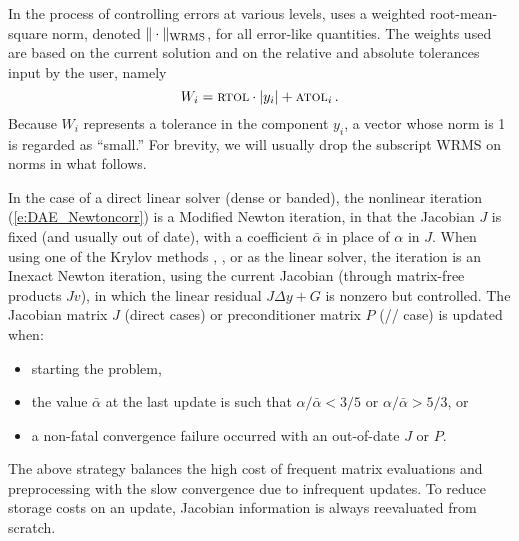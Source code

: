 In the process of controlling errors at various levels, {\ida} uses a
weighted root-mean-square norm, denoted 
$\|\cdot\|_{\mbox{\scriptsize WRMS}}$, for all 
error-like quantities.  The weights used are based on the current
solution and on the relative and absolute tolerances input by the
user, namely
\begin{equation}\label{e:errwt}
 W_i = \mbox{\sc rtol} \cdot |y_i| + \mbox{\sc atol}_i \, .
\end{equation}
Because $W_i$ represents a tolerance in the component $y_i$, a vector
whose norm is 1 is regarded as ``small.''  For brevity, we will
usually drop the subscript WRMS on norms in what follows.

In the case of a direct linear solver (dense or banded), the nonlinear 
iteration (\ref{e:DAE_Newtoncorr}) is a Modified Newton iteration, in
that the Jacobian $J$ is fixed (and usually out of date), with a coefficient 
$\bar\alpha$ in place of $\alpha$ in $J$. When using one of the Krylov methods
{\spgmr}, {\spbcg}, or {\sptfqmr} as the linear solver, the iteration is an
Inexact Newton iteration, using the current Jacobian (through matrix-free products
$Jv$), in which the linear residual $J\Delta y + G$ is nonzero but controlled.
The Jacobian matrix $J$ (direct cases) or preconditioner matrix $P$ 
({\spgmr}/{\spbcg}/{\sptfqmr} case) is updated when:
\begin{itemize}
\item starting the problem,
\item the value $\bar\alpha$ at the last update is such that
  $\alpha / {\bar\alpha} < 3/5$ or $\alpha / {\bar\alpha} > 5/3$, or
\item a non-fatal convergence failure occurred with an out-of-date $J$ or $P$.
\end{itemize}
The above strategy balances the high cost of frequent matrix evaluations
and preprocessing with the slow convergence due to infrequent updates.
To reduce storage costs on an update, Jacobian information is always
reevaluated from scratch.

